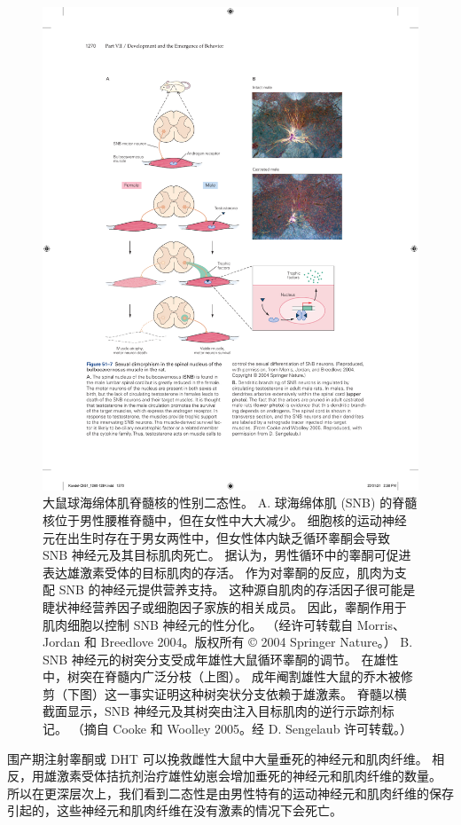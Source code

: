 \begin{figure}[htbp]
	\centering
	\includegraphics[width=0.8\linewidth]{chap51/fig_51_7}
	\caption{大鼠球海绵体肌脊髓核的性别二态性。 A. 球海绵体肌 (SNB) 的脊髓核位于男性腰椎脊髓中，但在女性中大大减少。 细胞核的运动神经元在出生时存在于男女两性中，但女性体内缺乏循环睾酮会导致 SNB 神经元及其目标肌肉死亡。 据认为，男性循环中的睾酮可促进表达雄激素受体的目标肌肉的存活。 作为对睾酮的反应，肌肉为支配 SNB 的神经元提供营养支持。 这种源自肌肉的存活因子很可能是睫状神经营养因子或细胞因子家族的相关成员。 因此，睾酮作用于肌肉细胞以控制 SNB 神经元的性分化。 （经许可转载自 Morris、Jordan 和 Breedlove 2004。版权所有 © 2004 Springer Nature。） B. SNB 神经元的树突分支受成年雄性大鼠循环睾酮的调节。 在雄性中，树突在脊髓内广泛分枝（上图）。 成年阉割雄性大鼠的乔木被修剪（下图）这一事实证明这种树突状分支依赖于雄激素。 脊髓以横截面显示，SNB 神经元及其树突由注入目标肌肉的逆行示踪剂标记。 （摘自 Cooke 和 Woolley 2005。经 D. Sengelaub 许可转载。）}
	\label{fig:51_7}
\end{figure}

围产期注射睾酮或 DHT 可以挽救雌性大鼠中大量垂死的神经元和肌肉纤维。 相反，用雄激素受体拮抗剂治疗雄性幼崽会增加垂死的神经元和肌肉纤维的数量。 所以在更深层次上，我们看到二态性是由男性特有的运动神经元和肌肉纤维的保存引起的，这些神经元和肌肉纤维在没有激素的情况下会死亡。

